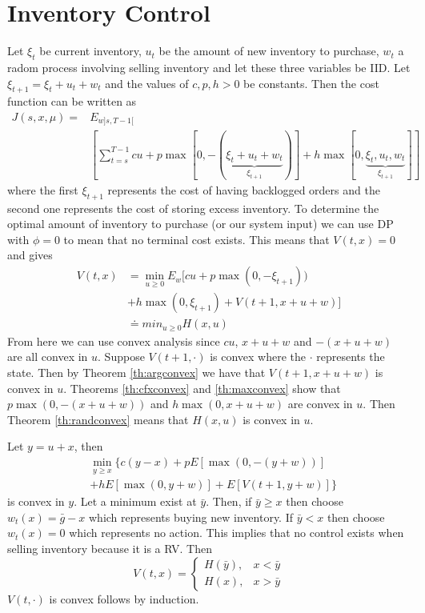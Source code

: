\documentclass[lecture,12pt,]{pcms-l}
\theoremstyle{example}
\begin{document}
\section{Inventory Control}
Let $\xi_t$ be current inventory, $u_t$ be the amount of new inventory to purchase, $w_t$ a radom process involving selling inventory and let these three variables be IID. Let $\xi_{t+1} = \xi_t+u_t+w_t$ and the values of $c,p,h>0$ be constants. Then the cost function can be written as
\begin{align*}
J(s,x,\mu) =& E_{w]s,T-1[} \\
&\left[\sum_{t=s}^{T-1}cu+p\max[0,-(\underbrace{\xi_t+u_t+w_t}_{\xi_{t+1}})] + h\max[0,\underbrace{\xi_t,u_t,w_t}_{\xi_{t+1}}] \right]
\end{align*}
where the first $\xi_{t+1}$ represents the cost of having backlogged orders and the second one represents the cost of storing excess inventory. To determine the optimal amount of inventory to purchase (or our system input) we can use DP with $\phi=0$ to mean that no terminal cost exists. This means that $V(t,x)=0$ and gives
\begin{align*}
V(t,x) &= \min_{u\geq 0}E_w[cu+p\max(0,-\xi_{t+1})) \\
&+ h\max(0,\xi_{t+1}) + V(t+1,x+u+w)] \\
&\doteq min_{u\geq 0}H(x,u)
\end{align*}
From here we can use convex analysis since $cu$, $x+u+w$ and $-(x+u+w)$ are all convex in $u$. Suppose $V(t+1,\cdot)$ is convex where the $\cdot$ represents the state. Then by Theorem \ref{th:argconvex} we have that $V(t+1,x+u+w)$ is convex in $u$. Theorems \ref{th:cfxconvex} and \ref{th:maxconvex} show that $p\max(0,-(x+u+w))$ and $h\max(0,x+u+w)$ are convex in $u$. Then Theorem \ref{th:randconvex} means that $H(x,u)$ is convex in $u$.

Let $y=u+x$, then
\begin{align*}
&\min_{y\geq x}\{ c(y-x)+pE[\max(0,-(y+w))] \\
&+ hE[\max(0,y+w)] + E[V(t+1,y+w)]\}
\end{align*}
is convex in $y$. Let a minimum exist at $\bar{y}$. Then, if $\bar{y}\geq x$ then choose $w_t(x) = \bar{g}-x$ which represents buying new inventory. If $\bar{y}<x$ then choose $w_t(x)=0$ which represents no action. This implies that no control exists when selling inventory because it is a RV. Then
$$V(t,x) = \begin{cases} H(\bar{y}), & x<\bar{y} \\ H(x), & x>\bar{y} \end{cases}$$
$V(t,\cdot)$ is convex follows by induction.
\end{document}
